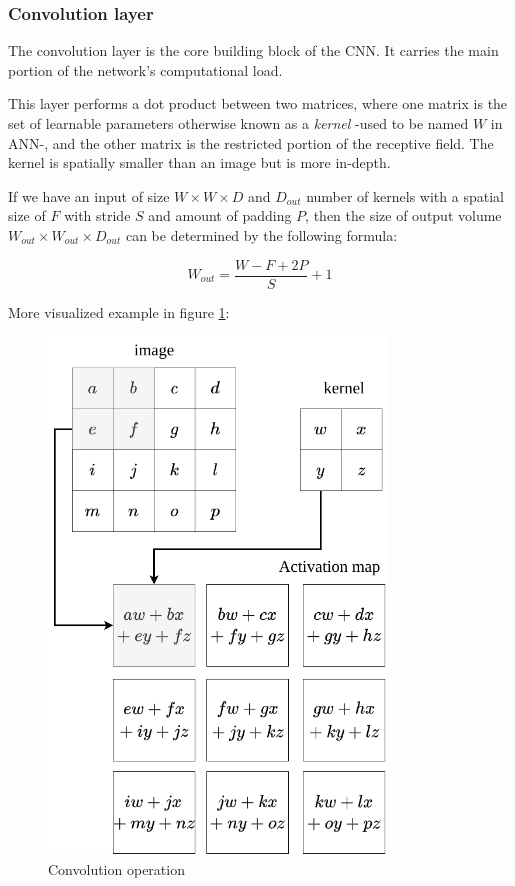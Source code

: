 \subsubsection{Convolution layer}
The convolution layer is the core building block of the CNN. It carries the main portion of the network’s computational load.

This layer performs a dot product between two matrices, where one matrix is the set of learnable parameters otherwise known as a \textit{kernel} -used to be named $W$ in ANN-, and the other matrix is the restricted portion of the receptive field. The kernel is spatially smaller than an image but is more in-depth. 

If we have an input of size $W \times W \times D$ and $D_{out}$ number of kernels with a spatial size of $F$ with stride $S$ and amount of padding $P$, then the size of output volume $W_{out}\times W_{out}\times D_{out}$ can be determined by the following formula:

\begin{equation} \label{eq:Formula for Convolution Layer}
    W_{out} = \frac{W - F + 2P}{S} + 1
\end{equation}

More visualized example in figure \ref{fig:cnn_2}:

\begin{figure}[h!]
    \centering
    \includegraphics[width=0.8\textwidth]{images/cnn_2.png}
    \caption{Convolution operation}
    \label{fig:cnn_2}
\end{figure}


